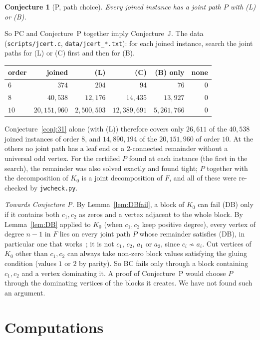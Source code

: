\documentclass[11pt]{amsart}
\newtheorem{conjecture}[theorem]{Conjecture}
\theoremstyle{definition}
\begin{document}
\begin{conjecture}[P, path choice]\label{conj:P}
Every joined instance has a joint path $P$ with \textup{(L)} or \textup{(B)}.
\end{conjecture}

So PC and Conjecture~P together imply Conjecture~J. The data (\texttt{scripts/jcert.c},
\texttt{data/jcert\_*.txt}): for each joined instance, search the joint paths for (L) or (C) first and then
for (B).
\begin{center}\footnotesize
\begin{tabular}{@{}lrrrrr@{}}
\toprule
order & joined & (L) & (C) & (B) only & none\\
\midrule
$6$ & $374$ & $204$ & $94$ & $76$ & $0$\\
$8$ & $40{,}538$ & $12{,}176$ & $14{,}435$ & $13{,}927$ & $0$\\
$10$ & $20{,}151{,}960$ & $2{,}500{,}503$ & $12{,}389{,}691$ & $5{,}261{,}766$ & $0$\\
\bottomrule
\end{tabular}
\end{center}
Conjecture~\ref{conj:31} alone (with (L)) therefore covers only $26{,}611$ of the $40{,}538$ joined instances of
order $8$, and $14{,}890{,}194$ of the $20{,}151{,}960$ of order $10$. At the others no joint path has a leaf end
or a $2$-connected remainder without a universal odd vertex. For the certified $P$ found at each instance (the first in the search), the remainder was also solved
exactly and found tight; $P$ together with the decomposition of $K_0$ is a joint decomposition of $F$, and
all of these were re-checked by \texttt{jwcheck.py}.

\emph{Towards Conjecture P.} By Lemma~\ref{lem:DBfail}, a block of $K_0$ can fail (DB) only if it contains
both $c_1,c_2$ as zeros and a vertex adjacent to the whole block. By Lemma~\ref{lem:DB} applied to $K_0$
(when $c_1,c_2$ keep positive degree), every vertex of degree $n-1$ in $F$ lies on every joint path $P$ whose
remainder satisfies (DB), in particular one that works~\cite[\S4]{CR}; it is
not $c_1$, $c_2$, $a_1$ or $a_2$, since $c_i\not\sim a_i$. Cut vertices of $K_0$
other than $c_1,c_2$ can always take non-zero block values satisfying the gluing condition (values $1$ or
$2$ by parity). So BC fails only through a block containing $c_1,c_2$ and a vertex dominating it. A proof
of Conjecture~P would choose $P$ through the dominating vertices of the blocks it creates. We have not
found such an argument.

\section{Computations}\label{sec:comp}
\end{document}
